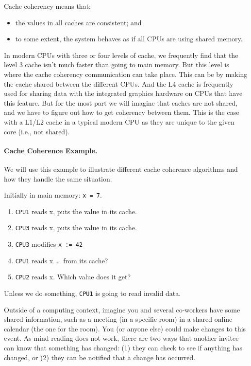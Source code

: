 \documentclass[a4paper]{report}
\begin{document}
Cache coherency means that:
  \begin{itemize}
    \item the values in all caches are consistent; and
    \item to some extent, the system behaves as if all CPUs are using shared memory.
  \end{itemize}
  
In modern CPUs with three or four levels of cache, we frequently find that the level 3 cache isn't much faster than going to main memory. But this level is where the cache coherency communication can take place. This can be by making the cache shared between the different CPUs. And the L4 cache is frequently used for sharing data with the integrated graphics hardware on CPUs that have this feature. But for the most part we will imagine that caches are not shared, and we have to figure out how to get coherency between them. This is the case with a L1/L2 cache in a typical modern CPU as they are unique to the given core (i.e., not shared).
  
\paragraph{Cache Coherence Example.} We will use this example to illustrate
different cache coherence algorithms and how they handle the same situation.

Initially in main memory: {\tt x = 7}.

  \begin{enumerate}
    \item {\tt CPU1} reads x, puts the value in its cache.
    \item {\tt CPU3} reads x, puts the value in its cache.
    \item {\tt CPU3} modifies {\tt x := 42}
    \item {\tt CPU1} reads x \ldots ~from its cache?
    \item {\tt CPU2} reads x. Which value does it get?
  \end{enumerate}

Unless we do something, {\tt CPU1} is going to read invalid data.
  
Outside of a computing context, imagine you and several co-workers have some shared information, such as a meeting (in a specific room) in a shared online calendar (the one for the room). You (or anyone else) could make changes to this event. As mind-reading does not work, there are two ways that another invitee can know that something has changed: (1) they can check to see if anything has changed, or (2) they can be notified that a change has occurred. 
\end{document}
